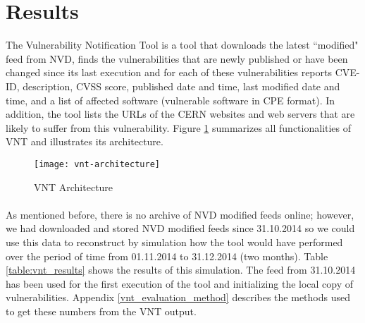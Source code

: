 \section{Results}
The Vulnerability Notification Tool is a tool that downloads the latest ``modified" feed from NVD, finds the vulnerabilities that are newly published or have been changed since its last execution and for each of these vulnerabilities reports CVE-ID, description, CVSS score, published date and time, last modified date and time, and a list of affected software (vulnerable software in CPE format). In addition, the tool lists the URLs of the CERN websites and web servers that are likely to suffer from this vulnerability. Figure \ref{figure:vnt_arch} summarizes all functionalities of VNT and illustrates its architecture.

\begin{figure}[H]
  \centering
    \texttt{[image: vnt-architecture]}
  \caption{VNT Architecture}
   \label{figure:vnt_arch}
\end{figure}




\paragraph{}
As mentioned before, there is no archive of NVD modified feeds online; however, we had downloaded and stored NVD modified feeds since 31.10.2014 so we could use this data to reconstruct by simulation how the tool would have performed over the period of time from 01.11.2014 to 31.12.2014 (two months). Table \ref{table:vnt_results} shows the results of this simulation. The feed from 31.10.2014 has been used for the first execution of the tool and initializing the local copy of vulnerabilities. Appendix \ref{vnt_evaluation_method} describes the methods used to get these numbers from the VNT output.

